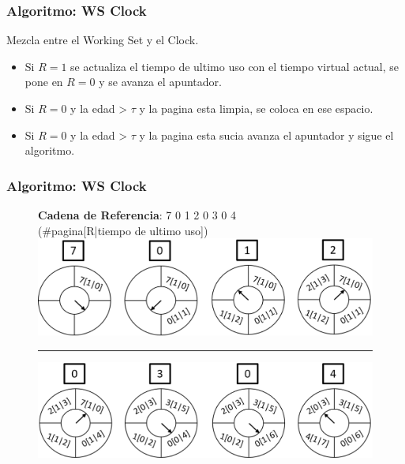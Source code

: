 \documentclass{beamer}
\newcommand{\algTitle}{\textbf{Algoritmo:} }
\begin{document}
\begin{frame}
	\frametitle{\algTitle WS Clock}

	Mezcla entre el Working Set y el Clock.
	\begin{itemize}
		\item Si $R = 1$ se actualiza el tiempo de ultimo uso con el tiempo virtual actual, se pone en $R=0$ y se avanza el apuntador.
		\item Si $R = 0$ y la edad > $\tau$ y la pagina esta limpia, se coloca en ese espacio.
		\item Si $R = 0$ y la edad > $\tau$ y la pagina esta sucia avanza el apuntador y sigue el algoritmo.
	\end{itemize}
\end{frame}

\begin{frame}
	\frametitle{\algTitle WS Clock}
	
	\begin{figure}[H]
		\textbf{Cadena de Referencia}: 7 0 1 2 0 3 0 4 \\
		 \footnotesize (\#pagina[R|tiempo de ultimo uso])
		\includegraphics[scale=0.5]{img/wsclockr1.png} 
		\\ \hrule
		\includegraphics[scale=0.5]{img/wsclockr2.png}
	\end{figure}
\end{frame}

\end{document}
